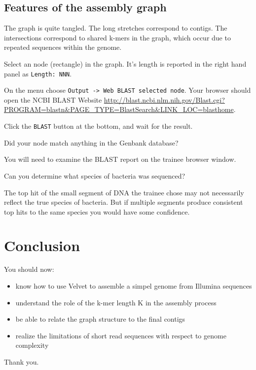 \subsection{Features of the assembly graph}
The graph is quite tangled. The long stretches correspond to contigs.
The intersections correspond to shared k-mers in the graph, which occur
due to repeated sequences within the genome.
\begin{steps}
\item Select an node (rectangle) in the graph. It's length is reported in the right hand panel as \texttt{Length: NNN}.
\item On the menu choose \texttt{Output -> Web BLAST selected node}. Your browser should open the
   NCBI BLAST Website \url{http://blast.ncbi.nlm.nih.gov/Blast.cgi?PROGRAM=blastn&PAGE_TYPE=BlastSearch&LINK_LOC=blasthome}.
\item Click the \texttt{BLAST} button at the bottom, and wait for the result.
\end{steps}

\begin{questions}
Did your node match anything in the Genbank database? \\
\begin{answer}
You will need to examine the BLAST report on the trainee browser window.
\end{answer}
Can you determine what species of bacteria was sequenced? \\
\begin{answer}
The top hit of the small segment of DNA the trainee chose may not necessarily
reflect the true species of bacteria. But if multiple segments produce consistent
top hits to the same species you would have some confidence.
\end{answer}
\end{questions}

\section{Conclusion}
You should now:
\begin{itemize}
\item know how to use Velvet to assemble a simpel genome from Illumina sequences
\item understand the role of the k-mer length K in the assembly process
\item be able to relate the graph structure to the final contigs
\item realize the limitations of short read sequences with respect to genome complexity
\end{itemize}
Thank you.
